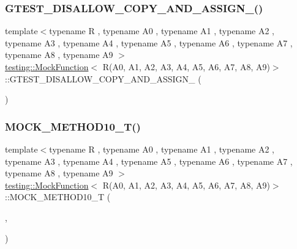 \subsubsection{\texorpdfstring{G\+T\+E\+S\+T\+\_\+\+D\+I\+S\+A\+L\+L\+O\+W\+\_\+\+C\+O\+P\+Y\+\_\+\+A\+N\+D\+\_\+\+A\+S\+S\+I\+G\+N\+\_\+()}{GTEST\_DISALLOW\_COPY\_AND\_ASSIGN\_()}}
{\footnotesize\ttfamily template$<$typename R , typename A0 , typename A1 , typename A2 , typename A3 , typename A4 , typename A5 , typename A6 , typename A7 , typename A8 , typename A9 $>$ \\
\hyperlink{classtesting_1_1MockFunction}{testing\+::\+Mock\+Function}$<$ R(A0, A1, A2, A3, A4, A5, A6, A7, A8, A9)$>$\+::G\+T\+E\+S\+T\+\_\+\+D\+I\+S\+A\+L\+L\+O\+W\+\_\+\+C\+O\+P\+Y\+\_\+\+A\+N\+D\+\_\+\+A\+S\+S\+I\+G\+N\+\_\+ (\begin{DoxyParamCaption}\item[{\hyperlink{classtesting_1_1MockFunction}{Mock\+Function}$<$ R(A0, A1, A2, A3, A4, A5, A6, A7, A8, A9)$>$}]{ }\end{DoxyParamCaption})\hspace{0.3cm}{\ttfamily [private]}}

\mbox{\label{classtesting_1_1MockFunction_3_01R_07A0_00_01A1_00_01A2_00_01A3_00_01A4_00_01A5_00_01A6_00_01A7_00_01A8_00_01A9_08_4_adb493fcbb4936734eda9cf99b4d0acd0}} 
\subsubsection{\texorpdfstring{M\+O\+C\+K\+\_\+\+M\+E\+T\+H\+O\+D10\+\_\+\+T()}{MOCK\_METHOD10\_T()}}
{\footnotesize\ttfamily template$<$typename R , typename A0 , typename A1 , typename A2 , typename A3 , typename A4 , typename A5 , typename A6 , typename A7 , typename A8 , typename A9 $>$ \\
\hyperlink{classtesting_1_1MockFunction}{testing\+::\+Mock\+Function}$<$ R(A0, A1, A2, A3, A4, A5, A6, A7, A8, A9)$>$\+::M\+O\+C\+K\+\_\+\+M\+E\+T\+H\+O\+D10\+\_\+T (\begin{DoxyParamCaption}\item[{Call}]{,  }\item[{R(A0, A1, A2, A3, A4, A5, A6, A7, A8, A9)}]{ }\end{DoxyParamCaption})}



